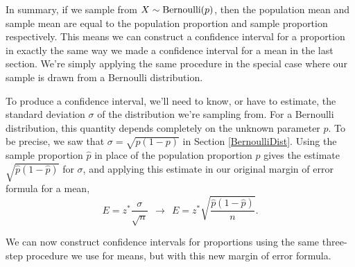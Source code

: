 In summary, if we sample from $X \sim \operatorname{Bernoulli}(p)$, then the population mean and sample mean are equal to the population proportion and sample proportion respectively. This means we can construct a confidence interval for a proportion in exactly the same way we made a confidence interval for a mean in the last section. We're simply applying the same procedure in the special case where our sample is drawn from a Bernoulli distribution.

To produce a confidence interval, we'll need to know, or have to estimate, the standard deviation $\sigma$ of the distribution we're sampling from. For a Bernoulli distribution, this quantity depends completely on the unknown parameter $p$. To be precise, we saw that $\sigma = \sqrt{p(1-p)}$ in Section \ref{BernoulliDist}. Using the sample proportion $\widehat{p}$ in place of the population proportion $p$ gives the estimate $\sqrt{\widehat{p}(1-\widehat{p})}$ for $\sigma$, and applying this estimate in our original margin of error formula for a mean,
$$E = z^{*}\frac{\sigma}{\sqrt{n}}  \ \ \longrightarrow \ \ E = z^{*}\sqrt{\frac{\widehat{p}(1-\widehat{p})}{n}} .$$

We can now construct confidence intervals for proportions using the same three-step procedure we use for means, but with this new margin of error formula.

